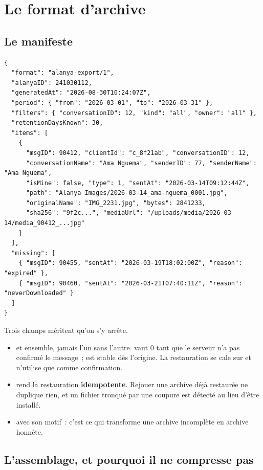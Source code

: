 \documentclass[11pt,a4paper,oneside]{report}
\begin{document}
\chapter{Le format d'archive}
\label{ch:format}

\section{Le manifeste}

\begin{lstlisting}[style=Alanya, language={}]
{
  "format": "alanya-export/1",
  "alanyaID": 241030112,
  "generatedAt": "2026-08-30T10:24:07Z",
  "period": { "from": "2026-03-01", "to": "2026-03-31" },
  "filters": { "conversationID": 12, "kind": "all", "owner": "all" },
  "retentionDaysKnown": 30,
  "items": [
    {
      "msgID": 90412, "clientId": "c_8f21ab", "conversationID": 12,
      "conversationName": "Ama Nguema", "senderID": 77, "senderName": "Ama Nguema",
      "isMine": false, "type": 1, "sentAt": "2026-03-14T09:12:44Z",
      "path": "Alanya Images/2026-03-14_ama-nguema_0001.jpg",
      "originalName": "IMG_2231.jpg", "bytes": 2841233,
      "sha256": "9f2c...", "mediaUrl": "/uploads/media/2026-03-14/media_90412_...jpg"
    }
  ],
  "missing": [
    { "msgID": 90455, "sentAt": "2026-03-19T18:02:00Z", "reason": "expired" },
    { "msgID": 90460, "sentAt": "2026-03-21T07:40:11Z", "reason": "neverDownloaded" }
  ]
}
\end{lstlisting}

Trois champs méritent qu'on s'y arrête.

\begin{itemize}[leftmargin=*]
  \item {} et  ensemble, jamais l'un sans l'autre. 
        vaut 0 tant que le serveur n'a pas confirmé le message~;  est stable
        dès l'origine. La restauration se cale sur  et n'utilise
         que comme confirmation.
  \item {} rend la restauration \textbf{idempotente}. Rejouer une archive déjà
        restaurée ne duplique rien, et un fichier tronqué par une coupure est détecté au
        lieu d'être installé.
  \item {} avec son motif~: c'est ce qui transforme une archive incomplète en
        archive honnête.
\end{itemize}

\section{L'assemblage, et pourquoi il ne compresse pas}
\end{document}

